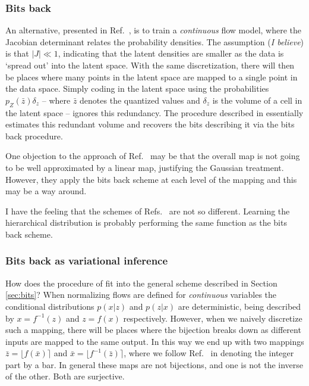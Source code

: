 \documentclass[preprint,notitlepage]{revtex4-1}
\begin{document}
\subsubsection{Bits back}

An alternative, presented in Ref.~\cite{Ho:2019aa}, is to train a \emph{continuous} flow model, where the Jacobian determinant relates the probability densities. The assumption (\emph{I believe}) is that $|J|\ll 1$, indicating that the latent densities are smaller as the data is `spread out' into the latent space. With the same discretization, there will then be places where many points in the latent space are mapped to a single point in the data space. Simply coding in the latent space using the probabilities $p_Z(\bar z)\delta_z$ -- where $\bar z$ denotes the quantized values and $\delta_z$ is the volume of a cell in the latent space -- ignores this redundancy. The procedure described in \cite{Ho:2019aa} essentially estimates this redundant volume and recovers the bits describing it via the bits back procedure.

One objection to the approach of Ref.~\cite{Ho:2019aa} may be that the overall map is not going to be well approximated by a linear map, justifying the Gaussian treatment. However, they apply the bits back scheme at each level of the mapping and this may be a way around.

I have the feeling that the schemes of Refs.~\cite{Hoogeboom:2019aa,Ho:2019aa} are not so different. Learning the hierarchical distribution is probably performing the same function as the bits back scheme.



\subsubsection{Bits back as variational inference}

How does the procedure of \cite{Ho:2019aa} fit into the general scheme described in Section \ref{sec:bits}? When normalizing flows are defined for \emph{continuous} variables the conditional distributions $p(x|z)$ and $p(z|x)$ are deterministic, being described by $x=f^{-1}(z)$ and $z=f(x)$ respectively. However, when we naively discretize such a mapping, there will be places where the bijection breaks down as different inputs are mapped to the same output. In this way we end up with two mappings $\bar z = \lfloor f(\bar x)\rceil$ and $\bar x = \lfloor f^{-1}(\bar z)\rceil$, where we follow Ref.~\cite{Ho:2019aa} in denoting the integer part by a bar. In general these maps are not bijections, and one is not the inverse of the other. Both are surjective.
\end{document}
